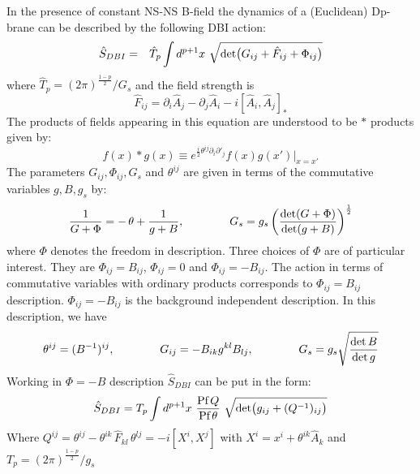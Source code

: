 \documentclass[a4paper,a4paper]{amsproc}
\theoremstyle{definition}
\theoremstyle{remark}
\numberwithin{equation}{section}
\begin{document}

In the presence of constant NS-NS B-field the dynamics of a
(Euclidean) Dp-brane can be described by the following DBI
action\cite{SW}:
%
\begin{eqnarray}
\hat{S}_{DBI} &=& \hat{T}_p \int d^{p+1} x~
\sqrt{\hbox{det}\big(G_{ij} + \hat{F}_{ij} + \Phi_{ij}\big)} \cr 
\end{eqnarray}
%
where $\hat T_p = (2\pi)^{\frac{1-p}{2}}/{G_s}$ and the field strength
is 
%
\begin{equation}
\hat F_{ij} =
\partial_i {\hat A}_j - \partial_j {\hat A}_i - i [\hat A_i, \hat
A_j]_{*}
\end{equation}
%
The products of fields appearing in this equation are understood to be
$*$ products given by:
%
\begin{equation}
f(x) * g(x) \equiv e^{\frac{i}{2}\theta^{ij}\partial_i \partial'_j} f(x)
g(x')\big|_{x=x'} 
\end{equation}
%
The parameters $G_{ij}, \Phi_{ij}, G_s$ and $\theta^{ij}$ are given in 
terms of the commutative variables $g, B, g_s$ by:
%
\begin{equation}
\label{defs}
\frac{1}{G + \Phi} = -\,\theta + \frac{1}{g+B}, \qquad\qquad G_s = g_s
\left(\frac{\hbox{det}(G+\Phi)}{\hbox{det}(g+B)}\right)^{\frac{1}{2}}
\end{equation}
%
where $\Phi$ denotes the freedom in description. Three choices of
$\Phi$ are of particular interest. They are $\Phi_{ij}=B_{ij}$,
$\Phi_{ij} = 0$ and $\Phi_{ij} = - B_{ij}$. The action in terms of
commutative variables with ordinary products corresponds to
$\Phi_{ij}=B_{ij}$ description. $\Phi_{ij} = - B_{ij}$ is the
background independent description. In this description, we have
%
\begin{equation}
\theta^{ij} = (B^{-1})^{ij},\qquad\qquad
G_{ij} = - B_{ik}g^{kl}B_{lj},\qquad\qquad
G_s = g_s \sqrt{\frac{\hbox{det}\,B}{\hbox{det}\,g}}
\end{equation}
%
Working in $\Phi = -B$ description  $\hat S_{DBI}$ can be put 
in the form:
%
\begin{eqnarray}
\hat S_{DBI}=T_p 
\int d^{p+1} x~ \frac{\hbox{Pf}\,Q}{\hbox{Pf}\, \theta} 
~\sqrt{\hbox{det}\big(g_{ij} + (Q^{-1})_{ij}\big)}
\end{eqnarray}
%
Where $Q^{ij} = \theta^{ij} - \theta^{ik}\,\hat F_{kl}\,\theta^{lj} =
-i[X^i, X^j]$ with $X^{i} = x^i + \theta^{ik}\hat A_k$ and $T_p =
(2\pi)^{\frac{1-p}{2}}/g_s$
\end{document}
